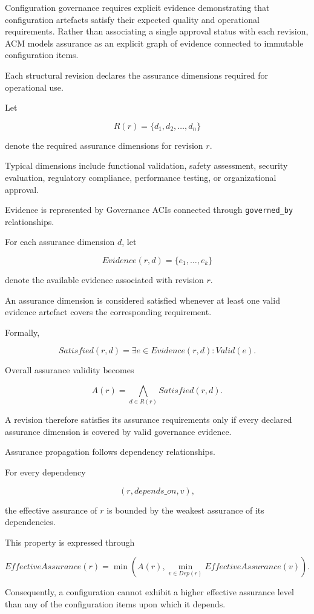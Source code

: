 \documentclass[10pt]{article}
\begin{document}
Configuration governance requires explicit evidence demonstrating that configuration artefacts satisfy their expected quality and operational requirements. Rather than associating a single approval status with each revision, ACM models assurance as an explicit graph of evidence connected to immutable configuration items.

Each structural revision declares the assurance dimensions required for operational use.

Let

\[
R(r)
=
\{
d_1,d_2,\ldots,d_n
\}
\]

denote the required assurance dimensions for revision \(r\).

Typical dimensions include functional validation, safety assessment, security evaluation, regulatory compliance, performance testing, or organizational approval.

Evidence is represented by Governance ACIs connected through \texttt{governed\_by} relationships.

For each assurance dimension \(d\), let

\[
Evidence(r,d)
=
\{
e_1,\ldots,e_k
\}
\]

denote the available evidence associated with revision \(r\).

An assurance dimension is considered satisfied whenever at least one valid evidence artefact covers the corresponding requirement.

Formally,

\[
Satisfied(r,d)
=
\exists e
\in
Evidence(r,d)
:
Valid(e).
\]

Overall assurance validity becomes

\[
A(r)
=
\bigwedge_{d\in R(r)}
Satisfied(r,d).
\]

A revision therefore satisfies its assurance requirements only if every declared assurance dimension is covered by valid governance evidence.

Assurance propagation follows dependency relationships.

For every dependency

\[
(r,depends\_on,v),
\]

the effective assurance of \(r\) is bounded by the weakest assurance of its dependencies.

This property is expressed through

\[
EffectiveAssurance(r)
=
\min
\left(
A(r),
\min_{v\in Dep(r)}
EffectiveAssurance(v)
\right).
\]

Consequently, a configuration cannot exhibit a higher effective assurance level than any of the configuration items upon which it depends.
\end{document}
